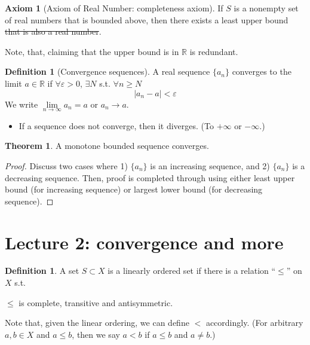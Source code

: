 \documentclass[12pt]{article}
\newcommand{\R}{{\mathbb R}}
\theoremstyle{definition}
\newtheorem{THM}{Theorem}
\newtheorem{axiom}[theorem]{Axiom}
\newtheorem{definition}[theorem]{Definition}
\theoremstyle{plain}
\begin{document}
\begin{axiom}
    [Axiom of Real Number: completeness axiom]
    If $S$ is a nonempty set of real numbers that is bounded above, then there 
    exists a least upper bound \sout{that is also a real number}.

    Note, that, claiming that the upper bound is in $\R$ is redundant.

\end{axiom}

\begin{definition}
    [Convergence sequences]
    A real sequence $\{a_n\}$ converges to the limit $a\in \R$ if $\forall 
    \varepsilon > 0$, $\exists N$ s.t. $\forall n \ge N$
    \[
        |a_n - a| < \varepsilon
    \]
    We write $\underset{n\to\infty} \lim a_n = a$ or $a_n \to a$.
\end{definition}

\begin{itemize}
    \item If a sequence does not converge, then it diverges. (To $+\infty$ or 
        $-\infty$.)
\end{itemize}

\begin{THM}
    A monotone bounded sequence converges.
    \begin{proof}
        Discuss two cases where 1) $\{a_n\}$ is an increasing sequence, and 2) $\{a_n\}$ 
        is a decreasing sequence. Then, proof is completed through using either 
        least upper bound (for increasing sequence) or largest lower bound (for 
        decreasing sequence).
    \end{proof}
\end{THM}


\section{Lecture 2: convergence and more}
\setcounter{theorem}{0}

\begin{definition}
    A set $S \subset X$ is a linearly ordered set if there is a relation 
    ``$\le$'' on $X$ s.t.

    \begin{center}
        $\le$ is complete, transitive and antisymmetric.
    \end{center}

    Note that, given the linear ordering, we can define $<$ accordingly. 
    (For arbitrary $a,b \in X$ and $a \le b$, then we say $a<b$ if $a \le b$ and 
    $a \not = b$.)
\end{definition}
\end{document}
